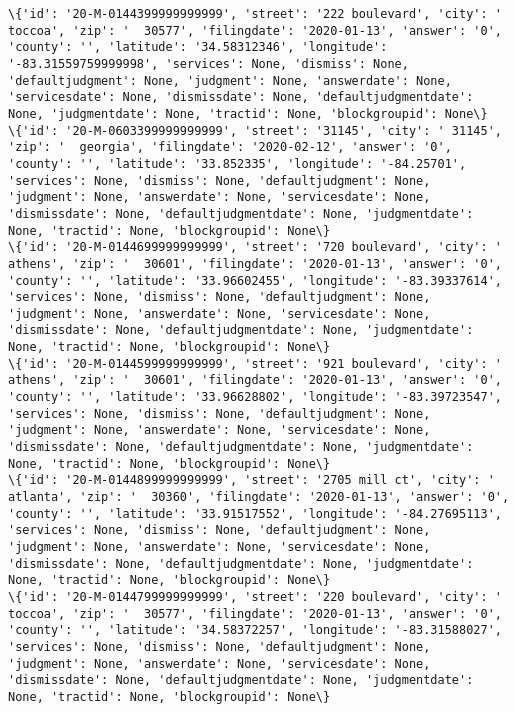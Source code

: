 \documentclass[11pt]{article}
\begin{document}
\begin{Verbatim}[commandchars=\\\{\}]
\{'id': '20-M-0144399999999999', 'street': '222 boulevard', 'city': '  toccoa', 'zip': '  30577', 'filingdate': '2020-01-13', 'answer': '0', 'county': '', 'latitude': '34.58312346', 'longitude': '-83.31559759999998', 'services': None, 'dismiss': None, 'defaultjudgment': None, 'judgment': None, 'answerdate': None, 'servicesdate': None, 'dismissdate': None, 'defaultjudgmentdate': None, 'judgmentdate': None, 'tractid': None, 'blockgroupid': None\}
\{'id': '20-M-0603399999999999', 'street': '31145', 'city': ' 31145', 'zip': '  georgia', 'filingdate': '2020-02-12', 'answer': '0', 'county': '', 'latitude': '33.852335', 'longitude': '-84.25701', 'services': None, 'dismiss': None, 'defaultjudgment': None, 'judgment': None, 'answerdate': None, 'servicesdate': None, 'dismissdate': None, 'defaultjudgmentdate': None, 'judgmentdate': None, 'tractid': None, 'blockgroupid': None\}
\{'id': '20-M-0144699999999999', 'street': '720 boulevard', 'city': '  athens', 'zip': '  30601', 'filingdate': '2020-01-13', 'answer': '0', 'county': '', 'latitude': '33.96602455', 'longitude': '-83.39337614', 'services': None, 'dismiss': None, 'defaultjudgment': None, 'judgment': None, 'answerdate': None, 'servicesdate': None, 'dismissdate': None, 'defaultjudgmentdate': None, 'judgmentdate': None, 'tractid': None, 'blockgroupid': None\}
\{'id': '20-M-0144599999999999', 'street': '921 boulevard', 'city': '  athens', 'zip': '  30601', 'filingdate': '2020-01-13', 'answer': '0', 'county': '', 'latitude': '33.96628802', 'longitude': '-83.39723547', 'services': None, 'dismiss': None, 'defaultjudgment': None, 'judgment': None, 'answerdate': None, 'servicesdate': None, 'dismissdate': None, 'defaultjudgmentdate': None, 'judgmentdate': None, 'tractid': None, 'blockgroupid': None\}
\{'id': '20-M-0144899999999999', 'street': '2705 mill ct', 'city': '  atlanta', 'zip': '  30360', 'filingdate': '2020-01-13', 'answer': '0', 'county': '', 'latitude': '33.91517552', 'longitude': '-84.27695113', 'services': None, 'dismiss': None, 'defaultjudgment': None, 'judgment': None, 'answerdate': None, 'servicesdate': None, 'dismissdate': None, 'defaultjudgmentdate': None, 'judgmentdate': None, 'tractid': None, 'blockgroupid': None\}
\{'id': '20-M-0144799999999999', 'street': '220 boulevard', 'city': '  toccoa', 'zip': '  30577', 'filingdate': '2020-01-13', 'answer': '0', 'county': '', 'latitude': '34.58372257', 'longitude': '-83.31588027', 'services': None, 'dismiss': None, 'defaultjudgment': None, 'judgment': None, 'answerdate': None, 'servicesdate': None, 'dismissdate': None, 'defaultjudgmentdate': None, 'judgmentdate': None, 'tractid': None, 'blockgroupid': None\}

\end{Verbatim}
\end{document}
